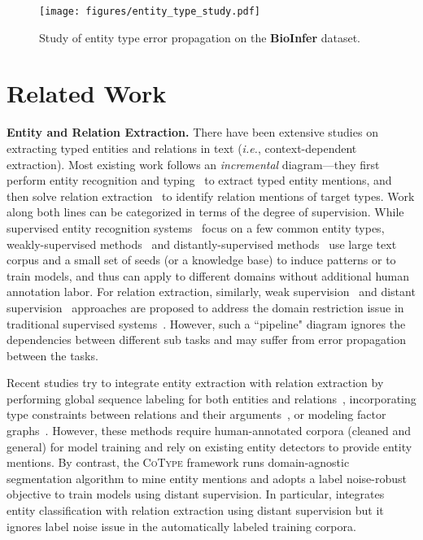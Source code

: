 \documentclass[letterpaper]{sig-alternate-2013}
\def\ie{{\sl i.e.}}
\begin{document}
\begin{figure}[t]
\vspace{-0.15cm}
\texttt{[image: figures/entity\_type\_study.pdf]}
\vspace{-0.1cm}
\caption{Study of entity type error propagation on the \textbf{BioInfer} dataset.}
\label{figure:pipeline_system}
\end{figure}
\section{Related Work}
\label{sec:related}


\noindent
\textbf{\small\textsf{Entity and Relation Extraction.}}
There have been extensive studies on extracting typed entities and relations in text (\ie, context-dependent extraction). Most existing work follows an \textit{incremental} diagram---they first perform entity recognition and typing~\cite{nadeau2007survey,ratinov2009design} to extract typed entity mentions, and then solve relation extraction~\cite{bach2007review,guodong2005exploring} to identify relation mentions of target types. Work along both lines can be categorized in terms of the degree of supervision. While supervised entity recognition systems~\cite{finkel2005incorporating,nadeau2007survey} focus on a few common entity types, weakly-supervised methods~\cite{gupta14evalpatterns,nakashole2013fine} and distantly-supervised methods~\cite{ren2015clustype,Yogatama2015embedding,ling2012fine} use large text corpus and a small set of seeds (or a knowledge base) to induce patterns or to train models, and thus can apply to different domains without additional human annotation labor.
For relation extraction, similarly, weak supervision~\cite{bunescu2007learning,etzioni2004web} and distant supervision~\cite{nagesh2014noisy,xu2013filling,surdeanu2012MIME,hoffmann2011multiR,riedel2010modeling,mintz2009distant} approaches are proposed to address the domain restriction issue in traditional supervised systems~\cite{bach2007review,mooney2005subsequence,guodong2005exploring}. 
However, such a ``pipeline" diagram ignores the dependencies between different sub tasks and may suffer from error propagation between the tasks. 

Recent studies try to integrate entity extraction with relation extraction by performing global sequence labeling for both entities and relations~\cite{li2014incremental,miwa2014modeling,augenstein2015extracting}, incorporating type constraints between relations and their arguments~\cite{roth2007global}, or modeling factor graphs~\cite{singh2013joint}. However, these methods require human-annotated corpora (cleaned and general) for model training and rely on existing entity detectors to provide entity mentions.
By contrast, the \textsc{CoType} framework runs domain-agnostic segmentation algorithm to mine entity mentions and adopts a label noise-robust objective to train models using distant supervision. 
In particular, \cite{augenstein2015extracting} integrates entity classification with relation extraction using distant supervision but it ignores label noise issue in the automatically labeled training corpora.
\end{document}
